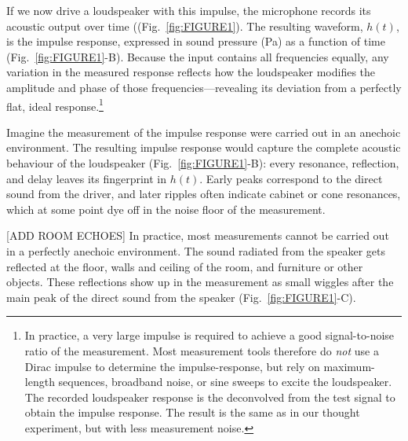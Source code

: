 \documentclass[12pt,a4paper]{article}
\providecommand{\figr}[1]{Fig.~\ref{fig:#1}}
\begin{document}
If we now drive a loudspeaker with this impulse, the microphone records its acoustic output over time ((\figr{FIGURE1}).  
The resulting waveform, $h(t)$, is the impulse response, expressed in sound pressure (Pa) as a function of time (\figr{FIGURE1}-B). Because the input contains all frequencies equally, any variation in the measured response reflects how the loudspeaker modifies the amplitude and phase of those frequencies—revealing its deviation from a perfectly flat, ideal response.\footnote{In practice, a very large impulse is required to achieve a good signal-to-noise ratio of the measurement. Most measurement tools therefore do \emph{not} use a Dirac impulse to determine the impulse-response, but rely on maximum-length sequences, broadband noise, or sine sweeps to excite the loudspeaker. The recorded loudspeaker response is the deconvolved from the test signal to obtain the impulse response. The result is the same as in our thought experiment, but with less measurement noise.}

Imagine the measurement of the impulse response were carried out in an anechoic environment. The resulting impulse response would capture the complete acoustic behaviour of the loudspeaker (\figr{FIGURE1}-B): every resonance, reflection, and delay leaves its fingerprint in $h(t)$. Early peaks correspond to the direct sound from the driver, and later ripples often indicate cabinet or cone resonances, which at some point dye off in the noise floor of the measurement.

[ADD ROOM ECHOES]
In practice, most measurements cannot be carried out in a perfectly anechoic environment. The sound radiated from the speaker gets reflected at the floor, walls and ceiling of the room, and furniture or other objects. These reflections show up in the measurement as small wiggles after the main peak of the direct sound from the speaker (\figr{FIGURE1}-C).
\end{document}
